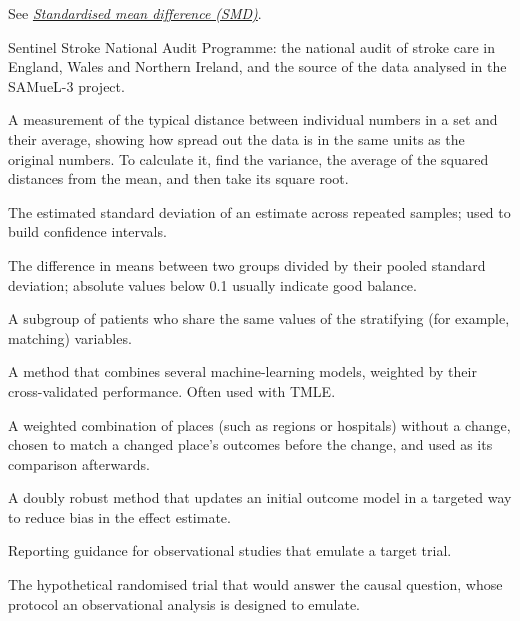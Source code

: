 \begin{description}[style=nextline, leftmargin=1.2em, itemsep=3pt, font=\normalfont\bfseries]
\item[SMD]
See \emph{\hyperref[gl:smd]{Standardised mean difference (SMD)}}.

\item[SSNAP]
Sentinel Stroke National Audit Programme: the national audit of stroke care in England, Wales and Northern Ireland, and the source of the data analysed in the SAMueL-3 project.

\item[Standard deviation]
A measurement of the typical distance between individual numbers in a set and their average, showing how spread out the data is in the same units as the original numbers. To calculate it, find the variance, the average of the squared distances from the mean, and then take its square root.

\item[Standard error]
The estimated standard deviation of an estimate across repeated samples; used to build confidence intervals.

\item[Standardised mean difference (SMD)]\label{gl:smd}
The difference in means between two groups divided by their pooled standard deviation; absolute values below 0.1 usually indicate good balance.

\item[Stratum (plural strata)]
A subgroup of patients who share the same values of the stratifying (for example, matching) variables.

\item[Super Learner]
A method that combines several machine-learning models, weighted by their cross-validated performance. Often used with TMLE.

\item[Synthetic control]
A weighted combination of places (such as regions or hospitals) without a change, chosen to match a changed place's outcomes before the change, and used as its comparison afterwards.

\item[Targeted maximum likelihood estimation (TMLE)]\label{gl:tmle}
A doubly robust method that updates an initial outcome model in a targeted way to reduce bias in the effect estimate.

\item[TARGET statement]
Reporting guidance for observational studies that emulate a target trial.

\item[Target trial]
The hypothetical randomised trial that would answer the causal question, whose protocol an observational analysis is designed to emulate.


\end{description}
